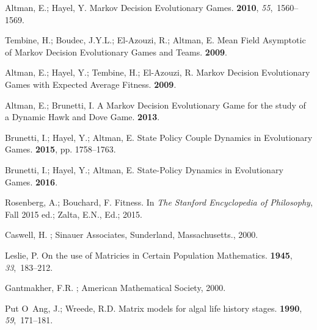 \documentclass[journal,article,accept,oneauthor,pdftex,10pt,a4paper,games]{mdpi}
\begin{document}
\begin{thebibliography}{999}
Altman, E.; Hayel, Y.
\newblock Markov Decision Evolutionary Games.
 {\bf 2010}, {\em
  55},~1560--1569.

Tembine, H.; Boudec, J.Y.L.; El-Azouzi, R.; Altman, E.
\newblock Mean Field Asymptotic of Markov Decision Evolutionary Games and
  Teams.
 {\bf 2009}.

Altman, E.; Hayel, Y.; Tembine, H.; El-Azouzi, R.
\newblock Markov Decision Evolutionary Games with Expected Average Fitness.
 {\bf 2009}.

Altman, E.; Brunetti, I.
\newblock A Markov Decision Evolutionary Game for the study of a Dynamic Hawk
  and Dove Game.
 {\bf 2013}.

Brunetti, I.; Hayel, Y.; Altman, E.
\newblock State Policy Couple Dynamics in Evolutionary Games.
 {\bf 2015}, pp. 1758--1763.

Brunetti, I.; Hayel, Y.; Altman, E.
\newblock State-Policy Dynamics in Evolutionary Games.
 {\bf 2016}.

Rosenberg, A.; Bouchard, F.
\newblock Fitness. In {\em The Stanford Encyclopedia of Philosophy}, Fall 2015
  ed.;  Zalta, E.N., Ed.;  2015.

Caswell, H.
; Sinauer Associates, Sunderland,
  Massachusetts.,  2000.

Leslie, P.
\newblock On the use of Matricies in Certain Population Mathematics.
 {\bf 1945}, {\em 33},~183--212.

Gantmakher, F.R.
; American Mathematical
  Society,  2000.

Put O~Ang, J.; Wreede, R.D.
\newblock Matrix models for algal life history stages.
 {\bf 1990}, {\em 59},~171--181.


\end{thebibliography}
\end{document}
